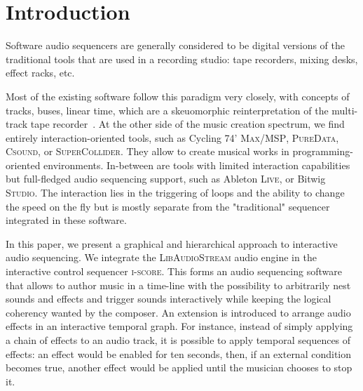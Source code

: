 \documentclass{article}
\title{\papertitle}
\newcommand*{\LibAudioStream}{\textsc{LibAudioStream}\xspace}
\newcommand*{\iscore}{\textsc{i-score}\xspace}
\newcommand*{\maxmsp}{Cycling 74' \textsc{Max/MSP}\xspace}
\newcommand*{\puredata}{\textsc{PureData}\xspace}
\newcommand*{\csound}{\textsc{Csound}\xspace}
\newcommand*{\supercollider}{\textsc{SuperCollider}\xspace}
\newcommand*{\abletonlive}{Ableton \textsc{Live}\xspace}
\newcommand*{\bitwigstudio}{Bitwig \textsc{Studio}\xspace}
\begin{document}
\capstartfalse
\maketitle
\capstarttrue

\begin{abstract}
The field of digital music authoring provides a wealth of creative environments in which music can be created and authored: patchers, programming languages, and multitrack sequencers.
By combining the \iscore interactive sequencer to the \LibAudioStream audio engine, a new music software able to represent and play rich interactive audio sequences is introduced.
We present new stream expressions compatible with the \LibAudioStream, and 
use them to create an interactive audio graph: hierarchical stream and send - return streams.
This allows to create branching and arbitrarily nested musical scores, in an OSC-centric environment.
Three examples of interactive musical scores are presented: the recreation of a traditional multi-track sequencer, an interactive musical score, and a temporal effect graph.
\end{abstract}

\section{Introduction}
Software audio sequencers are generally considered to be digital versions 
of the traditional tools that are used in a recording studio: tape recorders, 
mixing desks, effect racks, etc.

Most of the existing software follow this paradigm very closely, with 
concepts of tracks, buses, linear time, which are a skeuomorphic reinterpretation of the multi-track tape recorder~\cite{bell2015skeuomorphism}.
At the other side of the music creation spectrum, we find entirely interaction-oriented tools, 
such as \maxmsp, \puredata, \csound, or \supercollider. 
They allow to create musical works in programming-oriented environments.
In-between are tools with limited interaction capabilities but full-fledged audio sequencing support, 
such as \abletonlive, or \bitwigstudio.
The interaction lies in the triggering of loops and the ability to change the speed on the fly but is mostly separate from the "traditional" sequencer integrated in these software.

In this paper, we present a graphical and hierarchical approach to interactive audio sequencing.
We integrate the \LibAudioStream audio engine in the interactive control sequencer \iscore.
This forms an audio sequencing software that allows to author music in a time-line 
with the possibility to arbitrarily nest sounds and effects and trigger sounds interactively 
while keeping the logical coherency wanted by the composer. 
An extension is introduced to arrange audio effects in an interactive temporal graph.
For instance, instead of simply applying a chain of effects to an audio track, it is possible to apply temporal sequences of effects: an effect would be enabled for ten seconds, then, if an external condition becomes true, another effect would be applied until the musician chooses to stop it.
\end{document}
